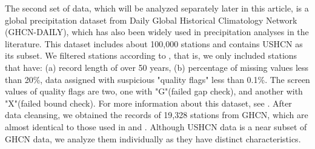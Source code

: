 \documentclass[12pt]{article}\usepackage[]{graphicx}\usepackage[]{color}
\begin{document}
The second set of data, which will be analyzed separately later in this article, is a global precipitation dataset from 
 Daily Global Historical Climatology Network (GHCN-DAILY), which has also been widely used in precipitation analyses in the literature. This dataset includes about 100,000 stations and contains USHCN as its subset. We filtered stations according to \cite{papalexiou2013extreme}, that is, we only included stations that have: (a) record length of over 50 years, (b) percentage of missing values less than 20\%, data assigned with suspicious "quality flags" less than 0.1\%. The screen values of quality flags are two, one with "G"(failed gap check), and another with "X"(failed bound check). For more information about this dataset, see \cite{menne2012overview}. 
After data cleansing, we obtained the records of 19,328 stations from GHCN, which are almost identical to those used in  \cite{papalexiou2012entropy} and \cite{papalexiou2013extreme}. Although USHCN data is a near subset of GHCN data, we analyze them  individually as they have distinct characteristics.
\end{document}
